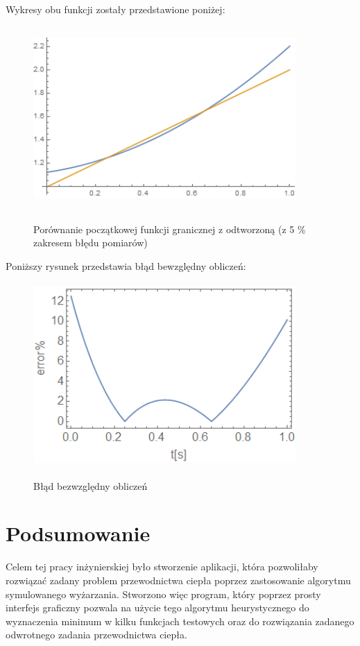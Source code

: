 \documentclass[twoside]{projektInzynierskiMS1}
\begin{document}
Wykresy obu funkcji zostały przedstawione poniżej: \\

\begin{figure}[H]
\begin{center}
		\includegraphics[height=7cm, width=10cm]{pics/5reconstruction.png}\\
	\caption{Porównanie początkowej funkcji granicznej z odtworzoną (z 5 \% zakresem błędu pomiarów)}
\end{center}
\end{figure}

Poniższy rysunek przedstawia błąd bewzględny obliczeń: \\

\begin{figure}[H]
\begin{center}
		\includegraphics[height=7cm, width=10cm]{pics/5abs.png}\\
	\caption{Błąd bezwzględny obliczeń}
\end{center}
\end{figure}





\section{Podsumowanie}
Celem tej pracy inżynierskiej było stworzenie aplikacji, która pozwoliłaby rozwiązać zadany problem przewodnictwa ciepła poprzez zastosowanie algorytmu symulowanego wyżarzania. Stworzono więc program, który poprzez prosty interfejs graficzny pozwala na użycie tego algorytmu heurystycznego do wyznaczenia minimum w kilku funkcjach testowych oraz do rozwiązania zadanego odwrotnego zadania przewodnictwa ciepła. \\
\end{document}
